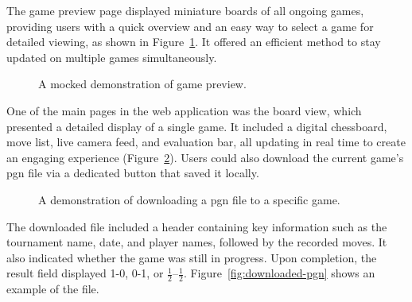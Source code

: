 The game preview page displayed miniature boards of all ongoing games, providing users with a quick overview and an easy way to select a game for detailed viewing, as shown in Figure~\ref{fig:game-preview}. It offered an efficient method to stay updated on multiple games simultaneously.

\begin{figure}[h!] \centering {}\caption[Display of game preview]{A mocked demonstration of game preview.}\label{fig:game-preview} \end{figure}

One of the main pages in the web application was the board view, which presented a detailed display of a single game. It included a digital chessboard, move list, live camera feed, and evaluation bar, all updating in real time to create an engaging experience (Figure~\ref{fig:download-pgn}). Users could also download the current game's \gls{pgn} file via a dedicated button that saved it locally. \\

\begin{figure}[h!] 
    \centering 
    \caption[Display of board view]{A demonstration of downloading a \gls{pgn} file to a specific game.}
    \label{fig:download-pgn} 
\end{figure}

The downloaded file included a header containing key information such as the tournament name, date, and player names, followed by the recorded moves. It also indicated whether the game was still in progress. Upon completion, the result field displayed 1-0, 0-1, or $\frac{1}{2}$–$\frac{1}{2}$. Figure~\ref{fig:downloaded-pgn} shows an example of the file. \\

